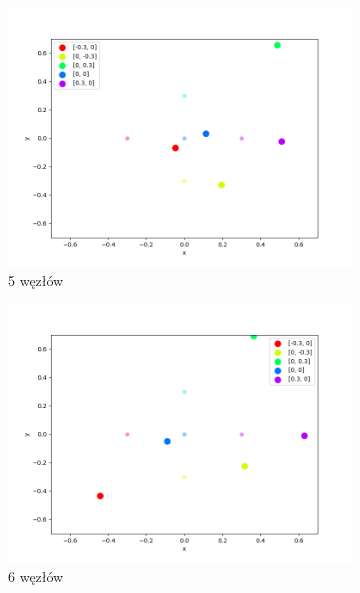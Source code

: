 \begin{figure}[h]
\begin{subfigure}{.5\textwidth}
    \includegraphics[width=\linewidth]{pics/mult_lat_2d_num/positions_5_mean.png}
\caption{5 węzłów}
\label{pic:2d_5_num_mult}
\end{subfigure}%
\begin{subfigure}{.5\textwidth}
    \centering
    \includegraphics[width=\linewidth]{pics/mult_lat_2d_num/positions_6_mean.png}
\caption{6 węzłów}
\label{pic:2d_6_num_mult}
\end{subfigure}
\begin{subfigure}{.5\textwidth}
    \centering

\end{subfigure}
\end{figure}
